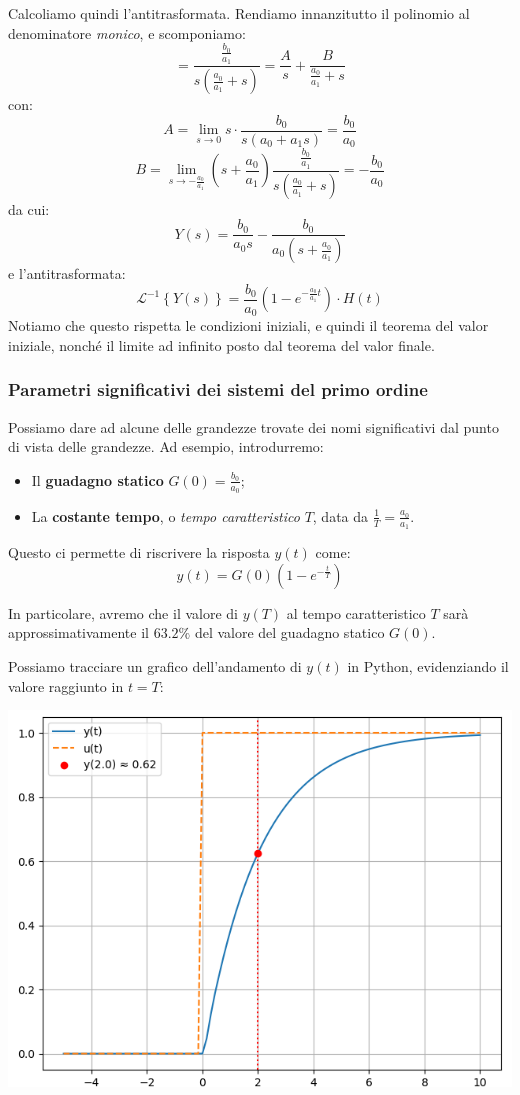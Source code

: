 \documentclass[a4paper,11pt]{article}
\begin{document}
Calcoliamo quindi l'antitrasformata.
Rendiamo innanzitutto il polinomio al denominatore \textit{monico}, e scomponiamo:
$$
= \frac{\frac{b_0}{a_1}}{s \left( \frac{a_0}{a_1} + s \right)} = \frac{A}{s} + \frac{B}{\frac{a_0}{a_1} + s}
$$
con:
$$
A = \lim_{s \rightarrow 0} s \cdot \frac{b_0}{s(a_0 + a_1 s)} = \frac{b_0}{a_0}
$$
$$
B = \lim_{s \rightarrow -\frac{a_0}{a_1}} \left( s + \frac{a_0}{a_1} \right)  \frac{\frac{b_0}{a_1}}{s \left( \frac{a_0}{a_1} + s \right)} = -\frac{b_0}{a_0}
$$
da cui:
$$
Y(s) = \frac{b_0}{a_0 s} - \frac{b_0}{a_0 \left( s + \frac{a_0}{a_1} \right)}
$$
e l'antitrasformata:
$$
\mathcal{L}^{-1} \left\{ Y(s) \right\} = \frac{b_0}{a_0} \left( 1 - e^{-\frac{a_0}{a_1}t} \right) \cdot H(t)
$$
Notiamo che questo rispetta le condizioni iniziali, e quindi il teorema del valor iniziale, nonché il limite ad infinito posto dal teorema del valor finale.

\subsubsection{Parametri significativi dei sistemi del primo ordine}
Possiamo dare ad alcune delle grandezze trovate dei nomi significativi dal punto di vista delle grandezze.
Ad esempio, introdurremo:
\begin{itemize}
	\item Il \textbf{guadagno statico} $G(0) = \frac{b_0}{a_0}$;
	\item La \textbf{costante tempo}, o \textit{tempo caratteristico} $T$, data da $\frac{1}{T} = \frac{a_0}{a_1}$.
\end{itemize}

Questo ci permette di riscrivere la risposta $y(t)$ come:
$$
y(t) = G(0) \left( 1 - e^{-\frac{t}{T}} \right)
$$

In particolare, avremo che il valore di $y(T)$ al tempo caratteristico $T$ sarà approssimativamente il $63.2 \%$ del valore del guadagno statico $G(0)$.

Possiamo tracciare un grafico dell'andamento di $y(t)$ in Python, evidenziando il valore raggiunto in $t = T$:
\begin{center}
	\includegraphics[scale=0.62]{../figures/first_degree_step_response.png}
\end{center}
\end{document}
